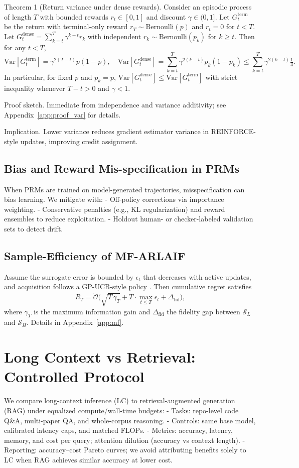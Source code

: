 \documentclass{article}
\begin{document}
Theorem 1 (Return variance under dense rewards). Consider an episodic process of length $T$ with bounded rewards $r_t\in[0,1]$ and discount $\gamma\in(0,1]$. Let $G_t^{\mathrm{term}}$ be the return with terminal-only reward $r_T\sim\mathrm{Bernoulli}(p)$ and $r_t=0$ for $t<T$. Let $G_t^{\mathrm{dense}}=\sum_{k=t}^T \gamma^{k-t} r_k$ with independent $r_k\sim\mathrm{Bernoulli}(p_k)$ for $k\ge t$. Then for any $t<T$,
\[
\mathrm{Var}[G_t^{\mathrm{term}}] = \gamma^{2(T-t)} p(1-p), \quad
\mathrm{Var}[G_t^{\mathrm{dense}}] = \sum_{k=t}^T \gamma^{2(k-t)} p_k(1-p_k) \le \sum_{k=t}^T \gamma^{2(k-t)} \tfrac{1}{4}.
\]
In particular, for fixed $p$ and $p_k=p$, $\mathrm{Var}[G_t^{\mathrm{dense}}] \le \mathrm{Var}[G_t^{\mathrm{term}}]$ with strict inequality whenever $T-t>0$ and $\gamma<1$.

Proof sketch. Immediate from independence and variance additivity; see Appendix~\ref{app:proof_var} for details.

Implication. Lower variance reduces gradient estimator variance in REINFORCE-style updates, improving credit assignment.

\subsection{Bias and Reward Mis-specification in PRMs}
When PRMs are trained on model-generated trajectories, misspecification can bias learning. We mitigate with:
- Off-policy corrections via importance weighting.
- Conservative penalties (e.g., KL regularization) and reward ensembles to reduce exploitation.
- Holdout human- or checker-labeled validation sets to detect drift.

\subsection{Sample-Efficiency of MF-ARLAIF}
\label{sec:mf_theory}
Assume the surrogate error is bounded by $\epsilon_t$ that decreases with active updates, and acquisition follows a GP-UCB-style policy \cite{srinivas2010gaussian}. Then cumulative regret satisfies
\[
R_T = \tilde{\mathcal{O}}\Big(\sqrt{T \, \gamma_T} + T \cdot \max_{t\le T}\epsilon_t + \Delta_{\mathrm{fid}}\Big),
\]
where $\gamma_T$ is the maximum information gain and $\Delta_{\mathrm{fid}}$ the fidelity gap between $\mathcal{S}_L$ and $\mathcal{S}_H$. Details in Appendix~\ref{app:mf}.

\section{Long Context vs Retrieval: Controlled Protocol}
\label{sec:lcr}
We compare long-context inference (LC) to retrieval-augmented generation (RAG) under equalized compute/wall-time budgets:
- Tasks: repo-level code Q\&A, multi-paper QA, and whole-corpus reasoning.
- Controls: same base model, calibrated latency caps, and matched FLOPs.
- Metrics: accuracy, latency, memory, and cost per query; attention dilution (accuracy vs context length).
- Reporting: accuracy–cost Pareto curves; we avoid attributing benefits solely to LC when RAG achieves similar accuracy at lower cost.
\end{document}
